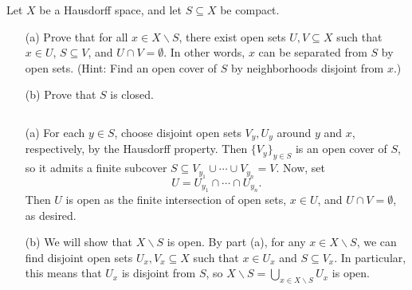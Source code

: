 \begin{exercise}
	Let $X$ be a Hausdorff space, and let $S \subseteq X$ be compact.
	\begin{enumerate}
		\item[(a)] Prove that for all $x \in X \backslash S$, there exist open sets $U,V \subseteq X$ such that $x \in U$, $S \subseteq V$, and $U \cap V=\emptyset$. In other words, $x$ can be separated from $S$ by open sets. (Hint: Find an open cover of $S$ by neighborhoods disjoint from $x$.)
		\item[(b)] Prove that $S$ is closed.
	\end{enumerate}
	\begin{sol}
		$ $
		\begin{enumerate}
			\item[(a)] For each $y \in S$, choose disjoint open sets $V_y,U_y$ around $y$ and $x$, respectively, by the Hausdorff property. Then $\{V_y\}_{y \in S}$ is an open cover of $S$, so it admits a finite subcover $S \subseteq V_{y_1} \cup \cdots \cup V_{y_n}=V$. Now, set $$U=U_{y_1} \cap \cdots \cap U_{y_n}.$$ Then $U$ is open as the finite intersection of open sets, $x \in U$, and $U \cap V=\emptyset$, as desired.
			\item[(b)] We will show that $X \backslash S$ is open. By part (a), for any $x \in X \backslash S$, we can find disjoint open sets $U_x,V_x \subseteq X$ such that $x \in U_x$ and $S \subseteq V_x$. In particular, this means that $U_x$ is disjoint from $S$, so $X \backslash S=\bigcup_{x \in X \backslash S} U_x$ is open.
		\end{enumerate}
	\end{sol}
\end{exercise}

